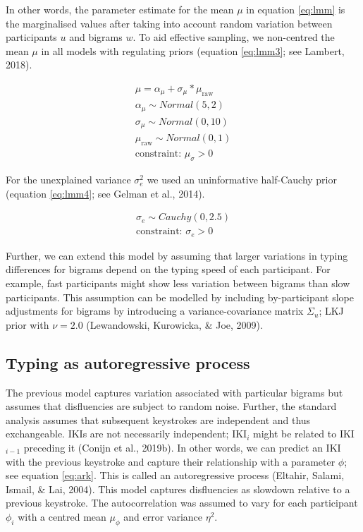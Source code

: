 \documentclass[english,man,floatsintext]{apa7}
\begin{document}
In other words, the parameter estimate for the mean \(\mu\) in equation \ref{eq:lmm} is the marginalised values after taking into account random variation between participants \(u\) and bigrams \(w\). To aid effective sampling, we non-centred the mean \(\mu\) in all models with regulating priors (equation \ref{eq:lmm3}; see Lambert, 2018).

\[
\tag{4}
\begin{aligned}
\mu = \alpha_{\mu} + \sigma_{\mu} * \mu_{\text{raw}}\\
\alpha_{\mu} \sim Normal(5,2)\\
\sigma_{\mu} \sim Normal(0,10)\\
\mu_{\text{raw}} \sim Normal(0,1)\\
\text{constraint: }\mu_{\sigma}>0 
\end{aligned}
\label{eq:lmm3}
\]

For the unexplained variance \(\sigma_e^2\) we used an uninformative half-Cauchy prior (equation \ref{eq:lmm4}; see Gelman et al., 2014).

\[
\tag{5}
\begin{aligned}
\sigma_e \sim Cauchy(0,2.5)\\
\text{constraint: }\sigma_e>0 
\end{aligned}
\label{eq:lmm4}
\]

Further, we can extend this model by assuming that larger variations in typing differences for bigrams depend on the typing speed of each participant. For example, fast participants might show less variation between bigrams than slow participants. This assumption can be modelled by including by-participant slope adjustments for bigrams by introducing a variance-covariance matrix \(\Sigma_u\); LKJ prior with \(\nu=2.0\) (Lewandowski, Kurowicka, \& Joe, 2009).

\hypertarget{typing-as-autoregressive-process}{%
\subsection{Typing as autoregressive process}\label{typing-as-autoregressive-process}}

The previous model captures variation associated with particular bigrams but assumes that disfluencies are subject to random noise. Further, the standard analysis assumes that subsequent keystrokes are independent and thus exchangeable. IKIs are not necessarily independent; IKI\(_{i}\) might be related to IKI\(_{i-1}\) preceding it (Conijn et al., 2019b). In other words, we can predict an IKI with the previous keystroke and capture their relationship with a parameter \(\phi\); see equation \ref{eq:ark}. This is called an autoregressive process (Eltahir, Salami, Ismail, \& Lai, 2004). This model captures disfluencies as slowdown relative to a previous keystroke. The autocorrelation was assumed to vary for each participant \(\phi_i\) with a centred mean \(\mu_{\phi}\) and error variance \(\eta^2\).
\end{document}
